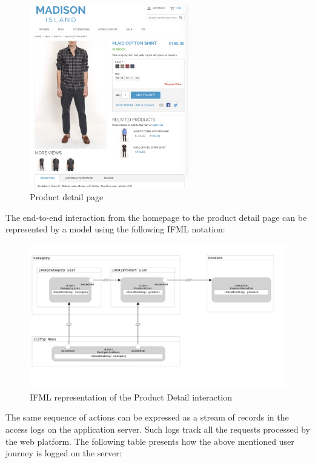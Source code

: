 \vspace{0.5cm}
\begin{figure}[H]
  \centering
    \includegraphics[height=8cm]{images/madison/product-detail.png}
  \caption{Product detail page}
  \label{fig:product-detail}
\end{figure}
\vspace{0.5cm}

The end-to-end interaction from the homepage to the product detail page can be represented by a model using the following IFML notation:

\vspace{0.5cm}
\begin{figure}[H]
  \centering
    \includegraphics[width=12cm]{images/madison/ifml1.png}
  \caption{IFML representation of the Product Detail interaction}
  \label{fig:ifml1}
\end{figure}
\vspace{0.5cm}

The same sequence of actions can be expressed as a stream of records in the access logs on the application server. Such logs track all the requests processed by the web platform. The following table presents how the above mentioned user journey is logged on the server:

